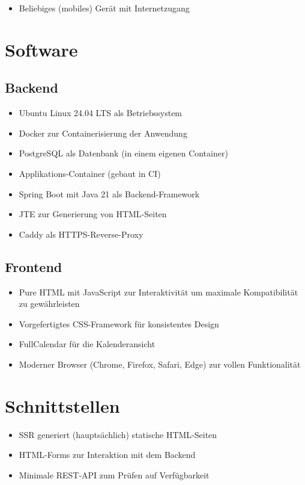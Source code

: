 \begin{itemize}
    \item Beliebiges (mobiles) Gerät mit Internetzugang
\end{itemize}

\section{Software}

\subsection{Backend}

\begin{itemize}
    \item Ubuntu Linux 24.04 LTS als Betriebssystem
    \item \gls{Docker} zur \gls{Container}isierung der Anwendung
    \item \gls{PostgreSQL} als Datenbank (in einem eigenen \gls{Container})
    \item Applikations-\gls{Container} (gebaut in \gls{CI})
    \item Spring Boot mit Java 21 als Backend-Framework
    \item JTE zur Generierung von \gls{HTML}-Seiten
    \item Caddy als HTTPS-Reverse-Proxy
\end{itemize}

\subsection{Frontend}

\begin{itemize}
    \item Pure \gls{HTML} mit \gls{JavaScript} zur Interaktivität um maximale Kompatibilität zu gewährleisten
    \item Vorgefertigtes \gls{CSS}-Framework für konsistentes Design
    \item FullCalendar für die Kalenderansicht
    \item Moderner \gls{Browser} (Chrome, Firefox, Safari, Edge) zur vollen Funktionalität
\end{itemize}

\section{Schnittstellen}

\begin{itemize}
    \item \gls{SSR} generiert (hauptsächlich) statische \gls{HTML}-Seiten
    \item \gls{HTML}-Forms zur Interaktion mit dem Backend
    \item Minimale \gls{REST}-\gls{API} zum Prüfen auf Verfügbarkeit
\end{itemize}